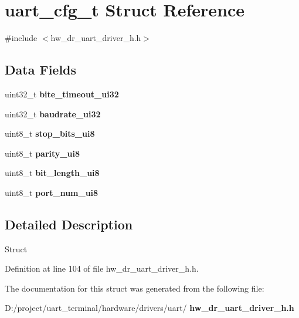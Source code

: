 \section{uart\+\_\+cfg\+\_\+t Struct Reference}
\label{structuart__cfg__t}


{\ttfamily \#include $<$hw\+\_\+dr\+\_\+uart\+\_\+driver\+\_\+h.\+h$>$}

\subsection*{Data Fields}
\begin{DoxyCompactItemize}
\item 
\mbox{\label{structuart__cfg__t_a21b4fafd71a101090e9f60612c765009}} 
uint32\+\_\+t {\bfseries bite\+\_\+timeout\+\_\+ui32}
\item 
\mbox{\label{structuart__cfg__t_aaf32d07fc189441af4e2649a7339d9e9}} 
uint32\+\_\+t {\bfseries baudrate\+\_\+ui32}
\item 
\mbox{\label{structuart__cfg__t_a84083bd69901d4426b683bc9398e44aa}} 
uint8\+\_\+t {\bfseries stop\+\_\+bits\+\_\+ui8}
\item 
\mbox{\label{structuart__cfg__t_a6c40dc6f6a6dfaf793c4552a447b9cb3}} 
uint8\+\_\+t {\bfseries parity\+\_\+ui8}
\item 
\mbox{\label{structuart__cfg__t_a17a301f9f53b00cbe8d34ef64c4ec1e2}} 
uint8\+\_\+t {\bfseries bit\+\_\+length\+\_\+ui8}
\item 
\mbox{\label{structuart__cfg__t_ab8327f881c62d8fd08bc3ee7ab400c1e}} 
uint8\+\_\+t {\bfseries port\+\_\+num\+\_\+ui8}
\end{DoxyCompactItemize}


\subsection{Detailed Description}
Struct 

Definition at line 104 of file hw\+\_\+dr\+\_\+uart\+\_\+driver\+\_\+h.\+h.



The documentation for this struct was generated from the following file\+:\begin{DoxyCompactItemize}
\item 
D\+:/project/uart\+\_\+terminal/hardware/drivers/uart/\textbf{ hw\+\_\+dr\+\_\+uart\+\_\+driver\+\_\+h.\+h}\end{DoxyCompactItemize}
